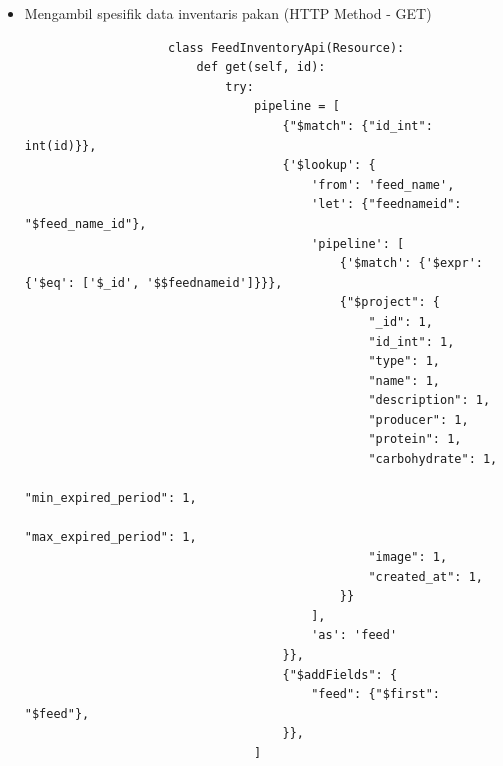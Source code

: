\begin{spacing}{1.5}
\begin{enumerate}
\begin{enumerate}
\begin{itemize}
\begin{lstlisting}
						def get(self):
							try:
								current_user = get_jwt_identity()
								farm = str(current_user['farm_id'])
								farm_id = ObjectId(farm)
					
								type = request.args.get('type') if request.args.get('type') else ""
					
								pipeline = [
									{"$sort": {"id_int": 1}},
									{
										'$match': {
											"farm_id": farm_id,
											'feed_category': {
												'$regex': type,
												'$options': 'i'
											}
										}
									},
									{'$lookup': {
										'from': 'feed_name',
										'let': {"feednameid": "$feed_name_id"},
										'pipeline': [
											{'$match': {'$expr': {'$eq': ['$_id', '$$feednameid']}}},
											{"$project": {
												"_id": 1,
												"id_int": 1,
												"type": 1,
												"name": 1,
												"description": 1,
												"producer": 1,
												"protein": 1,
												"carbohydrate": 1,
												"min_expired_period": 1,
												"max_expired_period": 1,
												"image": 1,
												"created_at": 1,
											}}
										],
										'as': 'feed'
									}},
									{"$addFields": {
										"feed": {"$first": "$feed"},
									}},
								]
							
								testing = FeedInventory.objects.aggregate(pipeline)
								temp = list(testing)
								response = json.dumps({
									'status': 'success',
									'data': temp,
								}, default=str)
								return Response(response, mimetype="application/json", status=200)
							except Exception as e:
								response = {"message": e}
								response = json.dumps(response, default=str)
								return Response(response, mimetype="application/json", status=400)
				\end{lstlisting}

				\item Mengambil spesifik data inventaris pakan (HTTP Method - GET)
				
				\begin{lstlisting}
					class FeedInventoryApi(Resource):
						def get(self, id):
							try:
								pipeline = [
									{"$match": {"id_int": int(id)}},
									{'$lookup': {
										'from': 'feed_name',
										'let': {"feednameid": "$feed_name_id"},
										'pipeline': [
											{'$match': {'$expr': {'$eq': ['$_id', '$$feednameid']}}},
											{"$project": {
												"_id": 1,
												"id_int": 1,
												"type": 1,
												"name": 1,
												"description": 1,
												"producer": 1,
												"protein": 1,
												"carbohydrate": 1,
												"min_expired_period": 1,
												"max_expired_period": 1,
												"image": 1,
												"created_at": 1,
											}}
										],
										'as': 'feed'
									}},
									{"$addFields": {
										"feed": {"$first": "$feed"},
									}},
								]
						

\end{lstlisting}
\end{itemize}
\end{enumerate}
\end{enumerate}
\end{spacing}
